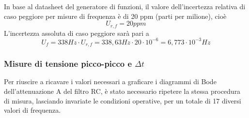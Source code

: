 In base al datasheet del generatore di funzioni, il valore dell'incertezza relativa di caso peggiore per misure di frequenza è di 20 ppm (parti per milione), cioè 
\[U_{r,f} = 20 ppm\]
L'incertezza assoluta di caso peggiore sarà pari a
\[U_f = 338 Hz\cdot U_{r,f} = 338,63Hz \cdot 20 \cdot 10^{-6} = 6,773\cdot10^{-3}Hz\]


\clearpage
\subsubsection{Misure di tensione picco-picco e $\Delta t$}

Per riuscire a ricavare i valori necessari a graficare i diagrammi di Bode dell'attenuazione A del filtro RC, è stato necessario ripetere la stessa procedura di misura, lasciando invariate le condizioni operative, per un totale di 17 diversi valori di frequenza.

